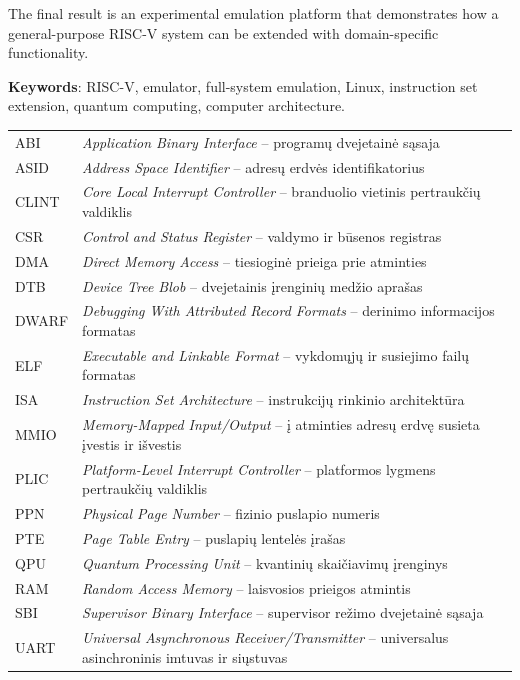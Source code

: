 The final result is an experimental emulation platform that demonstrates how a general-purpose RISC-V system can be extended with domain-specific functionality.

\vspace{1cm}
\textbf{Keywords}: RISC-V, emulator, full-system emulation, Linux, instruction set extension, quantum computing, computer architecture.


\singlespacing
\listoftables
\tableofcontents
\onehalfspacing
{}

\small
\begin{tabular}{lp{}}
    ABI & \textit{Application Binary Interface} -- programų dvejetainė sąsaja \\
    ASID & \textit{Address Space Identifier} -- adresų erdvės identifikatorius \\
    CLINT & \textit{Core Local Interrupt Controller} -- branduolio vietinis pertraukčių valdiklis \\
    CSR & \textit{Control and Status Register} -- valdymo ir būsenos registras \\
    DMA & \textit{Direct Memory Access} -- tiesioginė prieiga prie atminties \\
    DTB & \textit{Device Tree Blob} -- dvejetainis įrenginių medžio aprašas \\
    DWARF & \textit{Debugging With Attributed Record Formats} -- derinimo informacijos formatas \\
    ELF & \textit{Executable and Linkable Format} -- vykdomųjų ir susiejimo failų formatas \\
    ISA & \textit{Instruction Set Architecture} -- instrukcijų rinkinio architektūra \\
    MMIO & \textit{Memory-Mapped Input/Output} -- į atminties adresų erdvę susieta įvestis ir išvestis \\
    PLIC & \textit{Platform-Level Interrupt Controller} -- platformos lygmens pertraukčių valdiklis \\
    PPN & \textit{Physical Page Number} -- fizinio puslapio numeris \\
    PTE & \textit{Page Table Entry} -- puslapių lentelės įrašas \\
    QPU & \textit{Quantum Processing Unit} -- kvantinių skaičiavimų įrenginys \\
    RAM & \textit{Random Access Memory} -- laisvosios prieigos atmintis \\
    SBI & \textit{Supervisor Binary Interface} -- supervisor režimo dvejetainė sąsaja \\
    UART & \textit{Universal Asynchronous Receiver/Transmitter} -- universalus asinchroninis imtuvas ir siųstuvas \\
\end{tabular}

